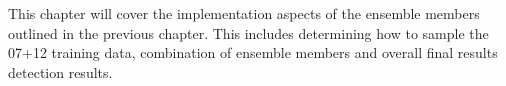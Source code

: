 This chapter will cover the implementation aspects of the ensemble members outlined in the previous chapter. This includes determining how to sample the 07+12 training data, combination of ensemble members and overall final results detection results.

